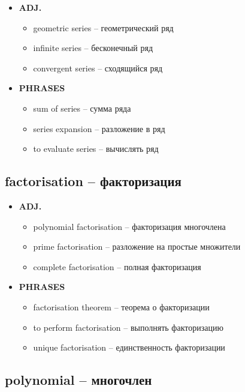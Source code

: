 \documentclass[a4paper, 10pt]{article}
\theoremstyle{definition}
\theoremstyle{plain}
\theoremstyle{remark}
\begin{document}
\begin{itemize}
    \item \textbf{ADJ.}
    \begin{itemize}
        \item geometric series – геометрический ряд
        \item infinite series – бесконечный ряд
        \item convergent series – сходящийся ряд
    \end{itemize}
    
    \item \textbf{PHRASES}
    \begin{itemize}
        \item sum of series – сумма ряда
        \item series expansion – разложение в ряд
        \item to evaluate series – вычислять ряд
    \end{itemize}
\end{itemize}

\subsection{factorisation – факторизация}

\begin{itemize}
    \item \textbf{ADJ.}
    \begin{itemize}
        \item polynomial factorisation – факторизация многочлена
        \item prime factorisation – разложение на простые множители
        \item complete factorisation – полная факторизация
    \end{itemize}
    
    \item \textbf{PHRASES}
    \begin{itemize}
        \item factorisation theorem – теорема о факторизации
        \item to perform factorisation – выполнять факторизацию
        \item unique factorisation – единственность факторизации
    \end{itemize}
\end{itemize}

\subsection{polynomial – многочлен}
\end{document}
